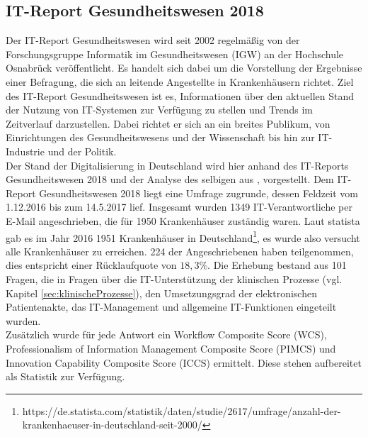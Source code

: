 \subsection{IT-Report Gesundheitswesen 2018}
Der IT-Report Gesundheitswesen wird seit 2002 regelmäßig von der Forschungsgruppe Informatik im Gesundheitswesen (IGW) an der Hochschule Osnabrück veröffentlicht. Es handelt sich dabei um die Vorstellung der Ergebnisse einer Befragung, die sich an leitende Angestellte in Krankenhäusern richtet. Ziel des IT-Report Gesundheitswesen ist es, Informationen über den aktuellen Stand der Nutzung von IT-Systemen zur Verfügung zu stellen und Trends im Zeitverlauf darzustellen. Dabei richtet er sich an ein breites Publikum, von Einrichtungen des Gesundheitswesens und der Wissenschaft bis hin zur IT-Industrie und der Politik. \parencite{huebner2019}\\

Der Stand der Digitalisierung in Deutschland wird hier anhand des IT-Reports Gesundheitswesen 2018 \parencite{huebner2018} und der Analyse des selbigen aus \cite{huebner2019}, vorgestellt. Dem IT-Report Gesundheitswesen 2018 liegt eine Umfrage zugrunde, dessen Feldzeit vom 1.12.2016 bis zum 14.5.2017 lief. Insgesamt wurden 1349 IT-Verantwortliche per E-Mail angeschrieben, die für 1950 Krankenhäuser zuständig waren. Laut statista gab es im Jahr 2016 1951 Krankenhäuser in Deutschland\footnote{https://de.statista.com/statistik/daten/studie/2617/umfrage/anzahl-der-krankenhaeuser-in-deutschland-seit-2000/}, es wurde also versucht alle Krankenhäuser zu erreichen. 224 der Angeschriebenen haben teilgenommen, dies entspricht einer Rücklaufquote von $18,3\%$. Die Erhebung bestand aus 101 Fragen, die in Fragen über die IT-Unterstützung der klinischen Prozesse (vgl. Kapitel \ref{sec:klinischeProzesse}), den Umsetzungsgrad der elektronischen Patientenakte, das IT-Management und allgemeine IT-Funktionen eingeteilt wurden.\\

Zusätzlich wurde für jede Antwort ein Workflow Composite Score (WCS), Professionalism of Information Management Composite Score (PIMCS) und Innovation Capability Composite Score (ICCS) ermittelt. Diese stehen aufbereitet als Statistik zur Verfügung.
